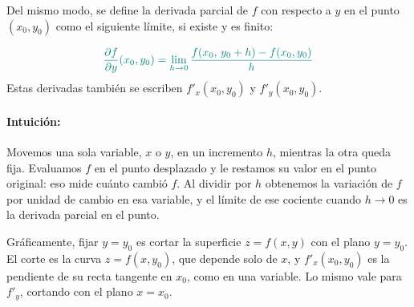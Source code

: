 \documentclass{article}
\begin{document}
Del mismo modo, se define la derivada parcial de \(f\) con respecto a \(y\) en el punto \((x_{0},y_{0})\) como el siguiente límite, si existe y es finito:

\[ \color{teal}
\frac{\partial f}{\partial y}(x_{0},y_{0})
=
\lim_{h\to0}
\frac{f(x_{0},\,y_{0}+h) - f(x_{0},y_{0})}{h}
\]
Estas derivadas también se escriben \(f'_x(x_0,y_0)\) y \(f'_y(x_0,y_0)\).

\paragraph*{Intuición:}

Movemos una sola variable, \(x\) o \(y\), en un incremento \(h\), mientras la otra queda fija. Evaluamos \(f\) en el punto desplazado y le restamos su valor en el punto original: eso mide cuánto cambió \(f\). Al dividir por \(h\) obtenemos la variación de \(f\) por unidad de cambio en esa variable, y el límite de ese cociente cuando \(h\to0\) es la derivada parcial en el punto.

Gráficamente, fijar \(y=y_0\) es cortar la superficie \(z=f(x,y)\) con el plano \(y=y_0\). El corte es la curva \(z=f(x,y_0)\), que depende solo de \(x\), y \(f'_x(x_0,y_0)\) es la pendiente de su recta tangente en \(x_0\), como en una variable. Lo mismo vale para \(f'_y\), cortando con el plano \(x=x_0\).
\end{document}
